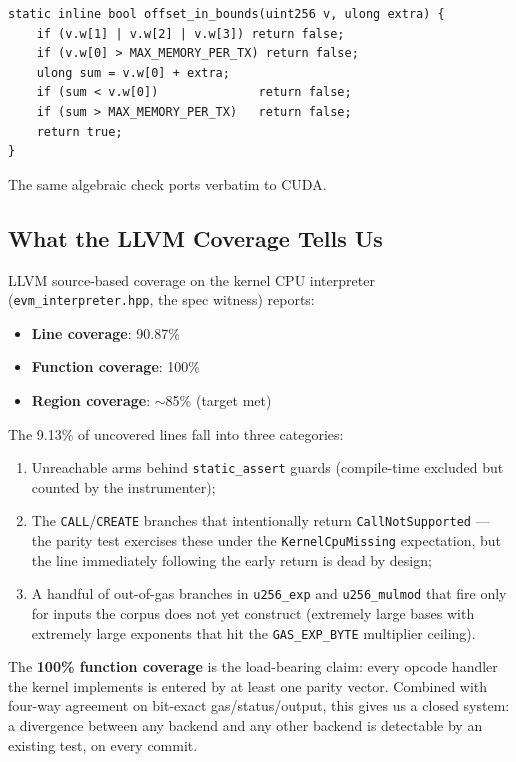 \begin{verbatim}
static inline bool offset_in_bounds(uint256 v, ulong extra) {
    if (v.w[1] | v.w[2] | v.w[3]) return false;
    if (v.w[0] > MAX_MEMORY_PER_TX) return false;
    ulong sum = v.w[0] + extra;
    if (sum < v.w[0])              return false;
    if (sum > MAX_MEMORY_PER_TX)   return false;
    return true;
}
\end{verbatim}

The same algebraic check ports verbatim to CUDA.

\subsection{What the LLVM Coverage Tells Us}

LLVM source-based coverage on the kernel CPU interpreter
(\texttt{evm\_interpreter.hpp}, the spec witness) reports:

\begin{itemize}
  \item \textbf{Line coverage}: 90.87\%
  \item \textbf{Function coverage}: 100\%
  \item \textbf{Region coverage}: $\sim$85\% (target met)
\end{itemize}

The 9.13\% of uncovered lines fall into three categories:

\begin{enumerate}
  \item Unreachable arms behind \texttt{static\_assert} guards (compile-time
    excluded but counted by the instrumenter);
  \item The \texttt{CALL}/\texttt{CREATE} branches that intentionally
    return \texttt{CallNotSupported} --- the parity test exercises these
    under the \texttt{KernelCpuMissing} expectation, but the line
    immediately following the early return is dead by design;
  \item A handful of out-of-gas branches in \texttt{u256\_exp} and
    \texttt{u256\_mulmod} that fire only for inputs the corpus does not
    yet construct (extremely large bases with extremely large exponents
    that hit the \texttt{GAS\_EXP\_BYTE} multiplier ceiling).
\end{enumerate}

The \textbf{100\% function coverage} is the load-bearing claim: every
opcode handler the kernel implements is entered by at least one parity
vector. Combined with four-way agreement on bit-exact gas/status/output,
this gives us a closed system: a divergence between any backend and any
other backend is detectable by an existing test, on every commit.

